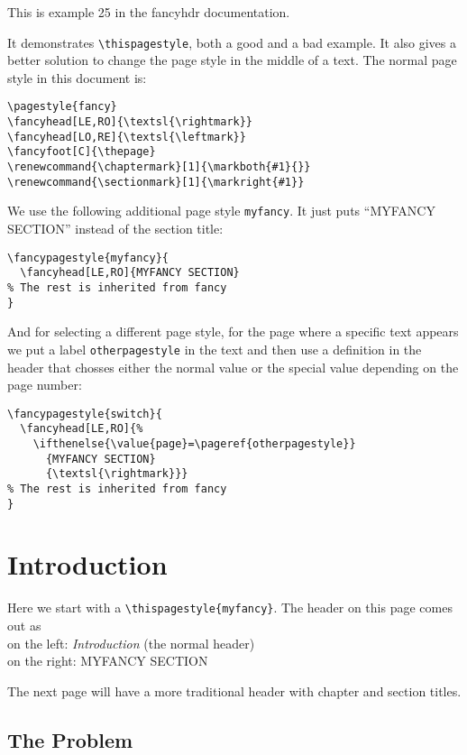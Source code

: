 \documentclass[openany]{book}
\renewcommand{\chaptermark}[1]{\markboth{#1}{}}
\renewcommand{\sectionmark}[1]{\markright{#1}}
\begin{document}
\tableofcontents
\newpage
\thispagestyle{plain}
\noindent
\begin{boxedminipage}{\textwidth}
This is example 25 in the fancyhdr documentation.

It demonstrates \verb|\thispagestyle|, both a good and a bad example.
It also gives a better solution to change the page style in the middle of a text.
The normal page style in this document is:
\begin{verbatim}
\pagestyle{fancy}
\fancyhead[LE,RO]{\textsl{\rightmark}}
\fancyhead[LO,RE]{\textsl{\leftmark}}
\fancyfoot[C]{\thepage}
\renewcommand{\chaptermark}[1]{\markboth{#1}{}}
\renewcommand{\sectionmark}[1]{\markright{#1}}
\end{verbatim}
We use the following additional page style \texttt{myfancy}. It just puts ``MYFANCY SECTION'' instead of the section title:
\begin{verbatim}
\fancypagestyle{myfancy}{
  \fancyhead[LE,RO]{MYFANCY SECTION}
% The rest is inherited from fancy
}
\end{verbatim}
And for selecting a different page style, for the page where a specific text appears we put a label \texttt{otherpagestyle} in the text and then use a definition in the header that chosses either the normal value or the special value depending on the page number:
\begin{verbatim}
\fancypagestyle{switch}{
  \fancyhead[LE,RO]{%
    \ifthenelse{\value{page}=\pageref{otherpagestyle}}
      {MYFANCY SECTION}
      {\textsl{\rightmark}}}
% The rest is inherited from fancy
}
\end{verbatim}

\end{boxedminipage}

\chapter{Introduction}
\thispagestyle{myfancy}

Here we start with a \verb|\thispagestyle{myfancy}|. The header on this page comes out as\\
on the left: \textsl{Introduction} (the normal header)\\
on the right: MYFANCY SECTION

The next page will have a more traditional header with chapter and section titles.

\bigskip

\lipsum[1]

\section{The Problem}
\label{sec:problem}
\end{document}
